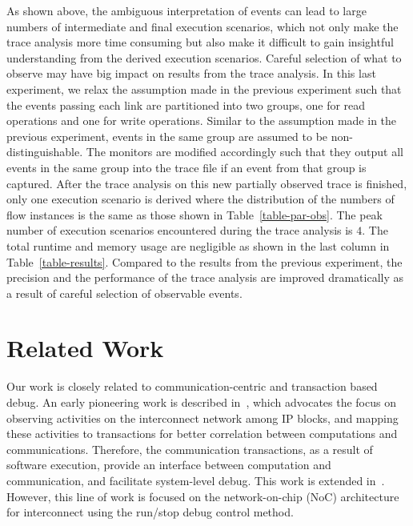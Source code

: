 \documentclass[conference]{IEEEtran}
\begin{document}
As shown above, the ambiguous interpretation of events can lead to large numbers of intermediate and final execution scenarios, which not only make the trace analysis more time consuming but also make it difficult to gain insightful understanding from the derived execution scenarios.  Careful selection of what to observe may have big impact on results from the trace analysis.  In this last experiment, we relax the assumption made in the previous experiment such that the events passing each link are partitioned into two groups, one for read operations and one for write operations.  Similar to the assumption made in the previous experiment, events in the same group are assumed to be non-distinguishable.  The monitors are modified accordingly such that they output all events in the same group into the trace file if an event from that group is captured.  After the trace analysis on this new partially observed trace is finished, only one execution scenario is derived where the distribution of the numbers of flow instances is the same as those shown in Table~\ref{table-par-obs}.  The peak number of execution scenarios encountered during the trace analysis is $4$.  The total runtime and memory usage are negligible as shown in the last column in Table~\ref{table-results}.  Compared to the results from the previous experiment, the precision and the performance of the trace analysis are improved dramatically as a result of careful selection of observable events. 

\section{Related Work}

Our work is closely related to communication-centric and
transaction based debug.  An early pioneering work is
described in~\cite{Goossens2007NOCS}, which advocates the
focus on observing activities on the interconnect network
among IP blocks, and mapping these activities to
transactions for better correlation between computations and
communications.  Therefore, the communication transactions,
as a result of software execution, provide an interface
between computation and communication, and facilitate
system-level debug.  This work is extended
in~\cite{Vermeulen2009VLSI-DAT,Goossens2009DATE}.  However,
this line of work is focused on the network-on-chip (NoC)
architecture for interconnect using the run/stop debug
control method.
\end{document}
